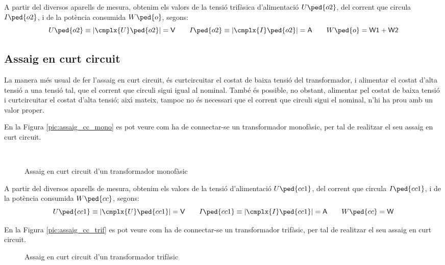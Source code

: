 A partir del diversos aparells de mesura, obtenim els valors de la
tensi\'{o} trif\`{a}sica d'alimentaci\'{o} $U\ped{o2}$, del corrent que circula
$I\ped{o2}$, i de la pot\`{e}ncia consumida $W\ped{o}$, segons:
\begin{equation}
    U\ped{o2}\equiv|\cmplx{U}\ped{o2}|=\textsf{V} \qquad
    I\ped{o2}\equiv|\cmplx{I}\ped{o2}|=\textsf{A} \qquad
    W\ped{o}=\textsf{W1}+\textsf{W2}
\end{equation}

\subsection{Assaig en curt circuit}

La manera m\'{e}s usual de fer l'assaig en curt circuit, \'{e}s
curtcircuitar el costat de baixa tensi\'{o} del transformador, i
alimentar el costat d'alta tensi\'{o} a  una tensi\'{o} tal, que el corrent
que circuli sigui igual al nominal. Tamb\'{e} \'{e}s possible, no obstant,
alimentar pel costat de baixa tensi\'{o} i curtcircuitar el costat
d'alta tensi\'{o}; aix\'{\i} mateix, tampoc no \'{e}s necessari que el corrent
que circuli sigui el nominal, n'hi ha prou amb un valor proper.

En la Figura \vref{pic:assaig_cc_mono} es pot veure com ha de
connectar-se un transformador monof\`{a}sic, per tal de realitzar el seu
assaig en curt circuit.

\begin{figure}[htb]
\centering
    
\caption{Assaig en curt circuit d'un transformador monof\`{a}sic}
\label{pic:assaig_cc_mono} \
\end{figure}

A partir del diversos aparells de mesura, obtenim els valors de la
tensi\'{o} d'alimentaci\'{o} $U\ped{cc1}$, del corrent que circula
$I\ped{cc1}$, i de la pot\`{e}ncia consumida $W\ped{cc}$, segons:
\begin{equation}
    U\ped{cc1}\equiv|\cmplx{U}\ped{cc1}|=\textsf{V} \qquad
    I\ped{cc1}\equiv|\cmplx{I}\ped{cc1}|=\textsf{A}
     \qquad W\ped{cc}=\textsf{W}
\end{equation}

En la Figura \vref{pic:assaig_cc_trif} es pot veure com ha de
connectar-se un transformador trif\`{a}sic, per tal de realitzar el seu
assaig en curt circuit.

\begin{figure}[htb]
\centering
    
\caption{Assaig en curt circuit d'un transformador trif\`{a}sic}
\label{pic:assaig_cc_trif}
\end{figure}


